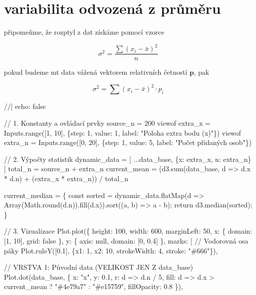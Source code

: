 \documentclass[
  czech,
  11pt,
  letterpaper,
  DIV=11,
  numbers=noendperiod]{scrreprt}
\newenvironment{Shaded}{\begin{snugshade}}{\end{snugshade}}
\newcommand{\NormalTok}[1]{\textcolor[rgb]{0.00,0.23,0.31}{#1}}
\begin{document}
\section{variabilita odvozená z
průměru}\label{variabilita-odvozenuxe1-z-prux16fmux11bru}

připomeňme, že rozptyl z dat získáme pomocí vzorce

\[\sigma^2 = \frac{\sum (x_i - \bar{x})^2}{n}\]

pokud budeme mt data vážená vektorem relativních četností
\(\mathbf{p}\), pak

\[ 
  \sigma^2 = \sum (x_i - \bar{x})^2\cdot p_i
\]

\begin{Shaded}
\begin{Highlighting}[]
\NormalTok{//| echo: false}

\NormalTok{// 1. Konstanty a ovládací prvky}
\NormalTok{source\_n = 200}
\NormalTok{viewof extra\_x = Inputs.range([1, 10], \{step: 1, value: 1, label: "Poloha extra bodu (x)"\})}
\NormalTok{viewof extra\_n = Inputs.range([0, 20], \{step: 1, value: 5, label: "Počet přidaných osob"\})}

\NormalTok{// 2. Výpočty statistik}
\NormalTok{dynamic\_data = [}
\NormalTok{  ...data\_base,}
\NormalTok{  \{x: extra\_x, n: extra\_n\}}
\NormalTok{]}
\NormalTok{total\_n = source\_n + extra\_n}
\NormalTok{current\_mean = (d3.sum(data\_base, d =\textgreater{} d.x * d.n) + (extra\_x * extra\_n)) / total\_n}

\NormalTok{current\_median = \{}
\NormalTok{  const sorted = dynamic\_data.flatMap(d =\textgreater{} Array(Math.round(d.n)).fill(d.x)).sort((a, b) =\textgreater{} a {-} b);}
\NormalTok{  return d3.median(sorted);}
\NormalTok{\}}

\NormalTok{// 3. Vizualizace}
\NormalTok{Plot.plot(\{}
\NormalTok{  height: 100,}
\NormalTok{  width: 600,}
\NormalTok{  marginLeft: 50,}
\NormalTok{  x: \{ domain: [1, 10], grid: false \},}
\NormalTok{  y: \{ axis: null, domain: [0, 0.4] \},}
\NormalTok{  marks: [}
\NormalTok{    // Vodorovná osa páky}
\NormalTok{    Plot.ruleY([0.1], \{x1: 1, x2: 10, strokeWidth: 4, stroke: "\#666"\}),}
    
\NormalTok{    // VRSTVA 1: Původní data (VELIKOST JEN Z data\_base)}
\NormalTok{    Plot.dot(data\_base, \{}
\NormalTok{      x: "x", }
\NormalTok{      y: 0.1, }
\NormalTok{      r: d =\textgreater{} d.n / 5, }
\NormalTok{      fill: d =\textgreater{} d.x \textgreater{} current\_mean ? "\#4e79a7" : "\#e15759",}
\NormalTok{      fillOpacity: 0.8}
\NormalTok{    \}),}
    

\end{Highlighting}
\end{Shaded}
\end{document}
